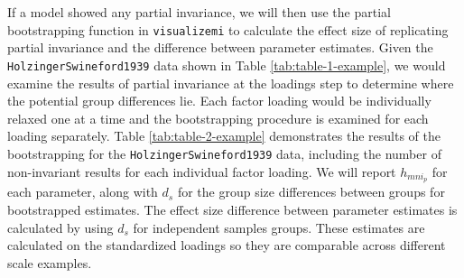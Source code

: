 \documentclass[
  english,
  man]{apa7}
\begin{document}
If a model showed any partial invariance, we will then use the partial bootstrapping function in \texttt{visualizemi} to calculate the effect size of replicating partial invariance and the difference between parameter estimates. Given the \texttt{HolzingerSwineford1939} data shown in Table \ref{tab:table-1-example}, we would examine the results of partial invariance at the loadings step to determine where the potential group differences lie. Each factor loading would be individually relaxed one at a time and the bootstrapping procedure is examined for each loading separately. Table \ref{tab:table-2-example} demonstrates the results of the bootstrapping for the \texttt{HolzingerSwineford1939} data, including the number of non-invariant results for each individual factor loading. We will report \(h_{mni_p}\) for each parameter, along with \(d_s\) for the group size differences between groups for bootstrapped estimates. The effect size difference between parameter estimates is calculated by using \(d_s\) for independent samples groups. These estimates are calculated on the standardized loadings so they are comparable across different scale examples.
\end{document}
